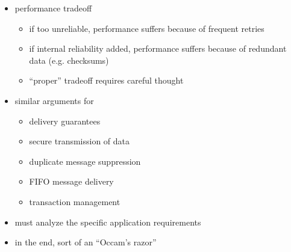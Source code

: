 \begin{itemize}
\begin{itemize}
    \end{itemize}
    \item performance tradeoff
    \begin{itemize}
        \item if too unreliable, performance suffers because of frequent retries
        \item if internal reliability added, performance suffers because of
        redundant data (e.g. checksums)
        \item ``proper'' tradeoff requires careful thought
    \end{itemize}
    \item similar arguments for
    \begin{itemize}
        \item delivery guarantees
        \item secure transmission of data
        \item duplicate message suppression
        \item FIFO message delivery
        \item transaction management
    \end{itemize}
    \item must analyze the specific application requirements
    \item in the end, sort of an ``Occam's razor''
\end{itemize}